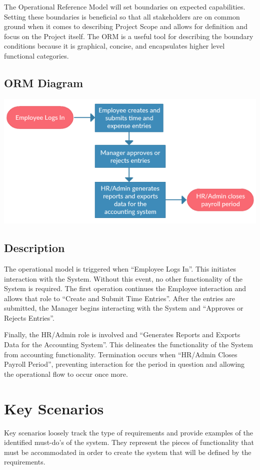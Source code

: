 \documentclass[12pt]{article}
\begin{document}
The Operational Reference Model will set boundaries on expected capabilities. Setting these boundaries is beneficial so that all stakeholders are on common ground when it comes to describing Project Scope and allows for definition and focus on the Project itself. The ORM is a useful tool for describing the boundary conditions because it is graphical, concise, and encapsulates higher level functional categories.

\subsection{ORM Diagram}

\begin{center}
	\includegraphics[scale=.85]{Graphs/ORM}
\end{center}

\subsection{Description}

The operational model is triggered when “Employee Logs In”. This initiates interaction with the System. Without this event, no other functionality of the System is required. The first operation continues the Employee interaction and allows that role to “Create and Submit Time Entries”. After the entries are submitted, the Manager begins interacting with the System and “Approves or Rejects Entries”.

Finally, the HR/Admin role is involved and “Generates Reports and Exports Data for the Accounting System”. This delineates the functionality of the System from accounting functionality. Termination occurs when “HR/Admin Closes Payroll Period”, preventing interaction for the period in question and allowing the operational flow to occur once more.

\section{Key Scenarios}
Key scenarios loosely track the type of requirements and provide examples of the identified must-do's of the system. They represent the pieces of functionality that must be accommodated in order to create the system that will be defined by the requirements.
\end{document}
